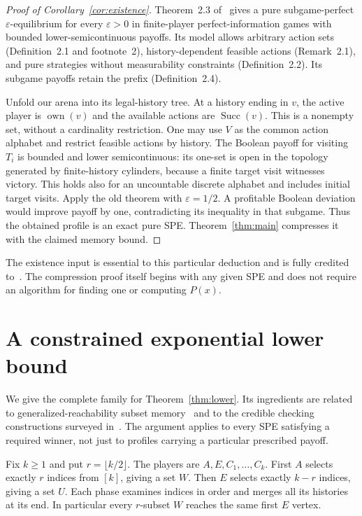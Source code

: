 \documentclass[acmlarge,11pt,screen,nonacm,natbib=false]{acmart}
\newcommand{\own}{\operatorname{own}}
\newcommand{\Succ}{\operatorname{Succ}}
\theoremstyle{remark}
\begin{document}
\begin{proof}[Proof of Corollary~\ref{cor:existence}]
Theorem~2.3 of~\cite{FKMSSV10} gives a pure subgame-perfect
$\varepsilon$-equilibrium for every $\varepsilon>0$ in finite-player
perfect-information games with bounded lower-semicontinuous payoffs.
Its model allows arbitrary action sets (Definition~2.1 and footnote~2),
history-dependent feasible actions (Remark~2.1), and pure strategies without
measurability constraints (Definition~2.2). Its subgame payoffs retain the
prefix (Definition~2.4).

Unfold our arena into its legal-history tree. At a history ending in $v$,
the active player is $\own(v)$ and the available actions are $\Succ(v)$.
This is a nonempty set, without a cardinality restriction. One may use $V$
as the common action alphabet and restrict feasible actions by history.
The Boolean payoff for visiting $T_i$ is bounded and lower semicontinuous:
its one-set is open in the topology generated by finite-history cylinders,
because a finite target visit witnesses victory. This holds also for an
uncountable discrete alphabet and includes initial target visits.
Apply the old theorem with $\varepsilon=1/2$. A profitable Boolean deviation
would improve payoff by one, contradicting its inequality in that subgame.
Thus the obtained profile is an exact pure SPE. Theorem~\ref{thm:main}
compresses it with the claimed memory bound.
\end{proof}

The existence input is essential to this particular deduction and is fully
credited to~\cite{FKMSSV10}. The compression proof itself begins with any
given SPE and does not require an algorithm for finding one or computing $P(x)$.

\section{A constrained exponential lower bound}\label{sec:lower}

We give the complete family for Theorem~\ref{thm:lower}. Its ingredients
are related to generalized-reachability subset memory~\cite{FH12} and to
the credible checking constructions surveyed in~\cite[Section~3.1.3]{BGMR23}.
The argument applies to every SPE satisfying a required winner, not just
to profiles carrying a particular prescribed payoff.

Fix $k\geq1$ and put $r=\lfloor k/2\rfloor$. The players are
$A,E,C_1,\ldots,C_k$. First $A$ selects exactly $r$ indices from $[k]$,
giving a set $W$. Then $E$ selects exactly $k-r$ indices, giving a set $U$.
Each phase examines indices in order and merges all its histories at its
end. In particular every $r$-subset $W$ reaches the same first $E$ vertex.
\end{document}
